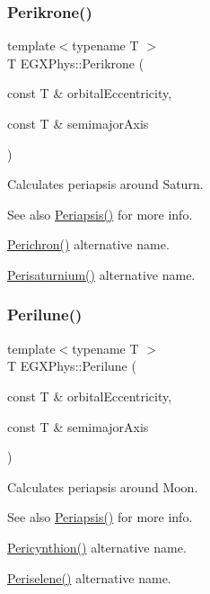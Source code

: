\subsubsection{\texorpdfstring{Perikrone()}{Perikrone()}}
{\footnotesize\ttfamily template$<$typename T $>$ \\
T E\+G\+X\+Phys\+::\+Perikrone (\begin{DoxyParamCaption}\item[{const T \&}]{orbital\+Eccentricity,  }\item[{const T \&}]{semimajor\+Axis }\end{DoxyParamCaption})}



Calculates periapsis around Saturn. 

\begin{DoxySeeAlso}{See also}
\mbox{\hyperlink{group___periapsis_ga4414ac75539371ec874a3d25cad6c9fe}{Periapsis()}} for more info. 

\mbox{\hyperlink{group___periapsis_ga12b5e99aa2e3e7031ef6ce93060cf516}{Perichron()}} alternative name. 

\mbox{\hyperlink{group___periapsis_ga60a50d09d29ebe47cbbfc125c2ea42bf}{Perisaturnium()}} alternative name. 
\end{DoxySeeAlso}
\mbox{\label{group___periapsis_ga2cc7ab05e18d32c94d8d74972e032793}} 
\subsubsection{\texorpdfstring{Perilune()}{Perilune()}}
{\footnotesize\ttfamily template$<$typename T $>$ \\
T E\+G\+X\+Phys\+::\+Perilune (\begin{DoxyParamCaption}\item[{const T \&}]{orbital\+Eccentricity,  }\item[{const T \&}]{semimajor\+Axis }\end{DoxyParamCaption})}



Calculates periapsis around Moon. 

\begin{DoxySeeAlso}{See also}
\mbox{\hyperlink{group___periapsis_ga4414ac75539371ec874a3d25cad6c9fe}{Periapsis()}} for more info. 

\mbox{\hyperlink{group___periapsis_gaeeba153b188cd06cbd233eaef12f0a6a}{Pericynthion()}} alternative name. 

\mbox{\hyperlink{group___periapsis_ga255874374dde571531e443cdbef9ef0c}{Periselene()}} alternative name. 
\end{DoxySeeAlso}
\mbox{\label{group___periapsis_ga99d86af90179994e17158b082c502fd4}} 
